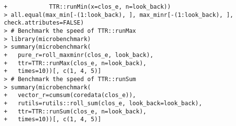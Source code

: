 \documentclass[10pt]{beamer}\usepackage[]{graphicx}\usepackage[]{color}
\makeatletter
\newenvironment{kframe}{%
 \def\at@end@of@kframe{}%
 \ifinner\ifhmode%
  \def\at@end@of@kframe{\end{minipage}}%
  \begin{minipage}{\columnwidth}%
 \fi\fi%
 \def\FrameCommand##1{\hskip\@totalleftmargin \hskip-\fboxsep
 \colorbox{shadecolor}{##1}\hskip-\fboxsep
     \hskip-\linewidth \hskip-\@totalleftmargin \hskip\columnwidth}%
 \MakeFramed {\advance\hsize-\width
   \@totalleftmargin\z@ \linewidth\hsize
   \@setminipage}}%
 {\par\unskip\endMakeFramed%
 \at@end@of@kframe}
\newenvironment{knitrout}{}{} %
\makeatother
\begin{document}
\begin{frame}[fragile,t]{\subsecname}
\begin{block}{}
\begin{columns}[T]
\begin{knitrout}
\begin{kframe}
\begin{verbatim}
+            TTR::runMin(x=clos_e, n=look_back))
> all.equal(max_min[-(1:look_back), ], max_minr[-(1:look_back), ], check.attributes=FALSE)
> # Benchmark the speed of TTR::runMax
> library(microbenchmark)
> summary(microbenchmark(
+   pure_r=roll_maxminr(clos_e, look_back),
+   ttr=TTR::runMax(clos_e, n=look_back),
+   times=10))[, c(1, 4, 5)]
> # Benchmark the speed of TTR::runSum
> summary(microbenchmark(
+   vector_r=cumsum(coredata(clos_e)),
+   rutils=rutils::roll_sum(clos_e, look_back=look_back),
+   ttr=TTR::runSum(clos_e, n=look_back),
+   times=10))[, c(1, 4, 5)]
\end{verbatim}
\end{kframe}
\end{knitrout}
  \end{columns}
\end{block}

\end{frame}


\end{document}
